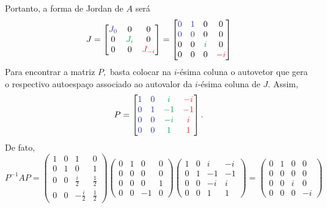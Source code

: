\documentclass[11pt,a4paper]{article}
\begin{document}
{\noindent
Portanto, a forma de Jordan de $A$ será
\[
J = \begin{bmatrix} \textcolor{Blue}{J_{0}} & 0 & 0 \\ 0 & \textcolor{Green}{J_{i}} & 0 \\  0 & 0  & \textcolor{Red}{J_{-i}}\end{bmatrix}
= \begin{bmatrix}  \textcolor{Blue}{0} & \textcolor{Blue}{1} & 0 & 0\\ \textcolor{Blue}{0} & \textcolor{Blue}{0} & 0 & 0 \\ 0 & 0 & \textcolor{Green}{i} & 0 \\ 0 & 0 & 0 & \textcolor{Red}{-i} \end{bmatrix}\]
Para encontrar a matriz $P,$ basta colocar na $i$-ésima coluna o autovetor que gera o respectivo autoespaço associado ao autovalor da $i$-ésima coluna de $J.$ Assim,
\[
P = \begin{bmatrix} \textcolor{Blue}{1} & \textcolor{Blue}{0} & \textcolor{Green}{i} & \textcolor{Red}{-i} \\
\textcolor{Blue}{0} & \textcolor{Blue}{1} & \textcolor{Green}{-1} & \textcolor{Red}{-1} \\
\textcolor{Blue}{0} & \textcolor{Blue}{0} & \textcolor{Green}{-i} & \textcolor{Red}{i} \\
\textcolor{Blue}{0} & \textcolor{Blue}{0} & \textcolor{Green}{1} & \textcolor{Red}{1} \\ \end{bmatrix}.
\]
De fato,
\[
P^{-1}AP = \left(\begin{matrix}
1 & 0 & 1 & 0 \\
0 & 1 & 0 & 1 \\
0 & 0 & \frac{i}{2} & \frac{1}{2} \\
0 & 0 & -\frac{i}{2} & \frac{1}{2}
\end{matrix}\right) \left(\begin{matrix}
0 & 1 &0 & 0 \\
0 &0 & 0 & 0 \\
0 & 0 & 0 &1 \\
0 & 0 & -1 & 0
\end{matrix}\right) \left(\begin{matrix}
1 & 0 & i & -i \\
0 & 1 & -1 & -1 \\
0 & 0 & -i & i \\
0 & 0 & 1 & 1
\end{matrix}\right) = \left(\begin{matrix}
0 & 1 & 0 & 0 \\
0 & 0 & 0 & 0 \\
0 & 0 & i & 0 \\
0 & 0 & 0 & -i
\end{matrix}\right)
\]
}
\end{document}

